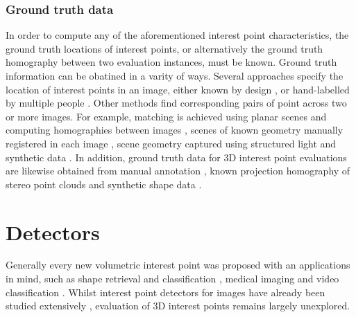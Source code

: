 
\subsubsection{Ground truth data} 

In order to compute any of the aforementioned interest point characteristics, the ground truth locations of interest points, or alternatively the ground truth homography between two evaluation instances, must be known. Ground truth information can be obatined in a varity of ways.  
Several approaches specify the location of interest points in an image, either known by design \cite{Rajan1989}, or hand-labelled by multiple people \cite{Heath1997}. 
Other methods find corresponding pairs of point across two or more images. For example, matching is achieved using planar scenes and computing homographies between images \cite{Schmid2000}, scenes of known geometry manually registered in each image \cite{Rosten2010}, scene geometry captured using structured light \cite{Aanaes2012} and synthetic data \cite{Laptev2005}. 
In addition, ground truth data for 3D interest point evaluations are likewise obtained from manual annotation \cite{Dutagaci2011}, known projection homography of stereo point clouds \cite{Aanaes2012} and synthetic shape data \cite{Salti2011}. 

\section{Detectors}
\label{sec/eval/detectors}

Generally every new volumetric interest point was proposed with an applications in mind, such as shape retrieval and classification \cite{Riemenschneider2009,Flitton2010,Knopp2010,Prasad2011}, medical imaging \cite{Criminisi2011,Ni2008,Donner2011} and video classification \cite{Willems2009,Laptev2005,Yu2010}. 
Whilst interest point detectors for images have already been studied extensively \cite{Mikolajczyk2005, Tuytelaars2008}, evaluation of 3D interest points remains largely unexplored. 

